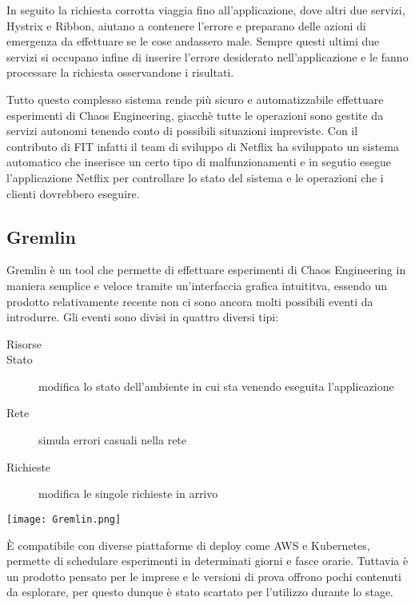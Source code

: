In seguito la richiesta corrotta viaggia fino all'applicazione, dove altri due servizi, Hystrix e Ribbon, aiutano a contenere l'errore e preparano delle azioni di emergenza da effettuare se le cose andassero male.
Sempre questi ultimi due servizi si occupano infine di inserire l'errore desiderato nell'applicazione e le fanno processare la richiesta osservandone i risultati.

Tutto questo complesso sistema rende più sicuro e automatizzabile effettuare esperimenti di Chaos Engineering, giacchè tutte le operazioni sono gestite da servizi autonomi tenendo conto di possibili situazioni impreviste.
Con il contributo di FIT infatti il team di sviluppo di Netflix ha sviluppato un sistema automatico che inserisce un certo tipo di malfunzionamenti e in segutio esegue l'applicazione Netflix per controllare lo stato del sistema e le operazioni che i clienti dovrebbero eseguire.

\subsection{Gremlin}
Gremlin è un tool che permette di effettuare esperimenti di Chaos Engineering in maniera semplice e veloce tramite un'interfaccia grafica intuititva, essendo un prodotto relativamente recente non ci sono ancora molti possibili eventi da introdurre.
Gli eventi sono divisi in quattro diversi tipi:
\begin{description}
    \item[Risorse]
    \item[Stato] modifica lo stato dell'ambiente in cui sta venendo eseguita l'applicazione
    \item[Rete] simula errori casuali nella rete
    \item[Richieste] modifica le singole richieste in arrivo    
\end{description}
\begin{center}
    \centering
    \texttt{[image: Gremlin.png]}
    \label{tab:gremlin}
\end{center}
È compatibile con diverse piattaforme di deploy come AWS e Kubernetes, permette di schedulare esperimenti in determinati giorni e fasce orarie.
Tuttavia è un prodotto pensato per le imprese e le versioni di prova offrono pochi contenuti da esplorare, per questo dunque è stato scartato per l'utilizzo durante lo stage.

